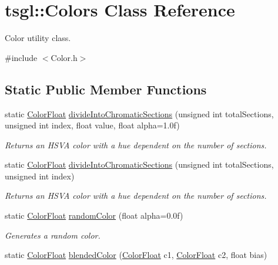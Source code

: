 \hypertarget{classtsgl_1_1_colors}{}\section{tsgl\+:\+:Colors Class Reference}
\label{classtsgl_1_1_colors}


Color utility class.  




{\ttfamily \#include $<$Color.\+h$>$}

\subsection*{Static Public Member Functions}
\begin{DoxyCompactItemize}
\item 
static \hyperlink{structtsgl_1_1_color_float}{Color\+Float} \hyperlink{classtsgl_1_1_colors_af610e20b5176294e24fdae4af4f5d6dc}{divide\+Into\+Chromatic\+Sections} (unsigned int total\+Sections, unsigned int index, float value, float alpha=1.\+0f)
\begin{DoxyCompactList}\small\item\em Returns an H\+S\+V\+A color with a hue dependent on the number of sections. \end{DoxyCompactList}\item 
static \hyperlink{structtsgl_1_1_color_float}{Color\+Float} \hyperlink{classtsgl_1_1_colors_ab9c66054f181ca5db5839ede985fb112}{divide\+Into\+Chromatic\+Sections} (unsigned int total\+Sections, unsigned int index)
\begin{DoxyCompactList}\small\item\em Returns an H\+S\+V\+A color with a hue dependent on the number of sections. \end{DoxyCompactList}\item 
static \hyperlink{structtsgl_1_1_color_float}{Color\+Float} \hyperlink{classtsgl_1_1_colors_a0f28a13af4a0fc352a250c23ecc97e4f}{random\+Color} (float alpha=0.\+0f)
\begin{DoxyCompactList}\small\item\em Generates a random color. \end{DoxyCompactList}\item 
static \hyperlink{structtsgl_1_1_color_float}{Color\+Float} \hyperlink{classtsgl_1_1_colors_ad80ab51c314f84ea53f9af81e54f8d51}{blended\+Color} (\hyperlink{structtsgl_1_1_color_float}{Color\+Float} c1, \hyperlink{structtsgl_1_1_color_float}{Color\+Float} c2, float bias)

\end{DoxyCompactItemize}
